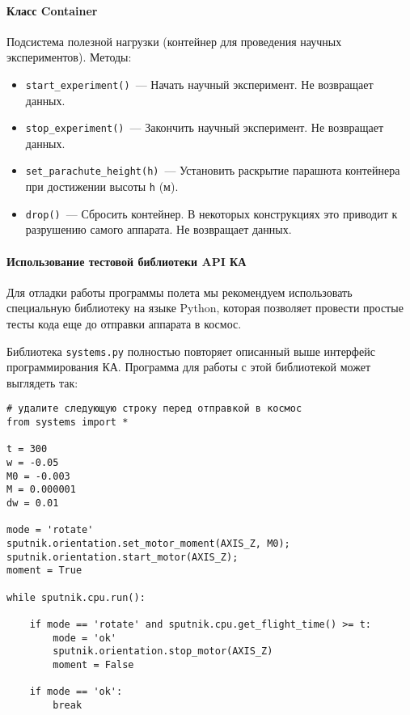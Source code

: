 \documentclass[12pt,a4paper]{article}
\begin{document}
\paragraph{Класс Container}

Подсистема полезной нагрузки (контейнер для проведения научных экспериментов). Методы:

\begin{itemize}
\item \verb'start_experiment()'~--- Начать научный эксперимент. Не возвращает данных.
\item \verb'stop_experiment()'~--- Закончить научный эксперимент. Не возвращает данных.
\item \verb'set_parachute_height(h)'~--- Установить раскрытие парашюта контейнера при
  достижении высоты \verb'h' (м).
\item \verb'drop()'~--- Сбросить контейнер. В некоторых конструкциях это приводит к
  разрушению самого аппарата. Не возвращает данных.
\end{itemize}

\paragraph{Использование тестовой библиотеки API КА}

Для отладки работы программы полета мы рекомендуем использовать специальную библиотеку на
языке Python, которая позволяет провести простые тесты кода еще до отправки аппарата в
космос.

Библиотека \verb'systems.py' полностью повторяет описанный выше интерфейс программирования
КА. Программа для работы с этой библиотекой может выглядеть так:

\begin{verbatim}
# удалите следующую строку перед отправкой в космос
from systems import *

t = 300
w = -0.05
M0 = -0.003
M = 0.000001
dw = 0.01

mode = 'rotate'
sputnik.orientation.set_motor_moment(AXIS_Z, M0);
sputnik.orientation.start_motor(AXIS_Z);
moment = True

while sputnik.cpu.run():

    if mode == 'rotate' and sputnik.cpu.get_flight_time() >= t: 
        mode = 'ok'
        sputnik.orientation.stop_motor(AXIS_Z)
        moment = False

    if mode == 'ok':
        break
\end{verbatim}
               
\end{document}
